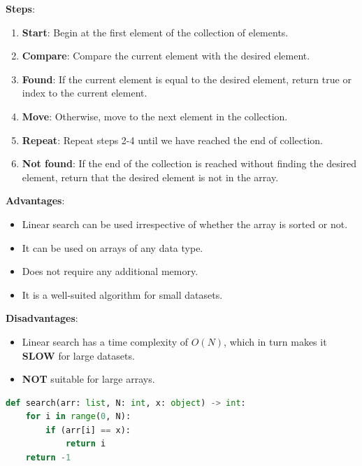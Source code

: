 \textbf{Steps}:
\begin{enumerate}
    \item \textbf{Start}: Begin at the first element of the collection of elements.
    \item \textbf{Compare}: Compare the current element with the desired element.
    \item \textbf{Found}: If the current element is equal to the desired element, return true or index to the current element.
    \item \textbf{Move}: Otherwise, move to the next element in the collection.
    \item \textbf{Repeat}: Repeat steps 2-4 until we have reached the end of collection.
    \item \textbf{Not found}: If the end of the collection is reached without finding the desired element, return that the desired element is not in the array.
\end{enumerate}

\begin{table}[h]
    \begin{minipage}[t]{0.48\linewidth}
        \textbf{Advantages}:
        \begin{itemize}
            \item Linear search can be used irrespective of whether the array is sorted or not. 
            \item It can be used on arrays of any data type.
            \item Does not require any additional memory.
            \item It is a well-suited algorithm for small datasets.
        \end{itemize}
    \end{minipage}
    \hfill
    \begin{minipage}[t]{0.48\linewidth}
        \textbf{Disadvantages}:
        \begin{itemize}
            \item Linear search has a time complexity of $O(N)$, which in turn makes it \textbf{SLOW} for large datasets.
            \item \textbf{NOT} suitable for large arrays.
        \end{itemize}
    \end{minipage}
\end{table}

\begin{lstlisting}[language=Python, caption=Linear Search Algorithm - Python]
def search(arr: list, N: int, x: object) -> int:
    for i in range(0, N):
        if (arr[i] == x):
            return i
    return -1
\end{lstlisting}

